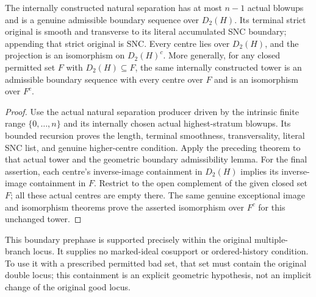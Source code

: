 \begin{theorem}
\label{hir:general-nc-permitted-double-locus-prephase}
\leanok
{}
The internally constructed natural separation has at most $n-1$
actual blowups and is a genuine admissible boundary sequence over
$D_2(H)$. Its terminal strict original is smooth and transverse
to its literal accumulated SNC boundary; appending that strict
original is SNC. Every centre lies over $D_2(H)$, and the projection
is an isomorphism on $D_2(H)^c$. More generally, for any closed
permitted set $F$ with $D_2(H)\subseteq F$, the same internally
constructed tower is an admissible boundary sequence with every centre
over $F$ and is an isomorphism
over $F^c$.
\end{theorem}
\begin{proof}
Use the actual natural separation producer driven by the intrinsic
finite range $\{0,\ldots,n\}$ and its internally chosen actual
highest-stratum blowups. Its bounded recursion proves the length,
terminal smoothness, transversality, literal SNC list, and genuine
higher-centre condition. Apply the preceding theorem to that actual
tower and the geometric boundary admissibility lemma. For the final
assertion, each centre's inverse-image
containment in $D_2(H)$ implies its inverse-image containment in $F$.
Restrict to the open complement of the given closed set $F$; all
these actual centres are empty there. The same genuine exceptional
image and isomorphism theorems prove the asserted isomorphism over
$F^c$ for this unchanged tower.
\end{proof}

This boundary prephase is supported precisely within the original
multiple-branch locus. It supplies no marked-ideal cosupport or
ordered-history condition. To use it with a prescribed permitted
bad set, that set must contain the original double locus; this
containment is an explicit geometric hypothesis, not an implicit
change of the original good locus.


